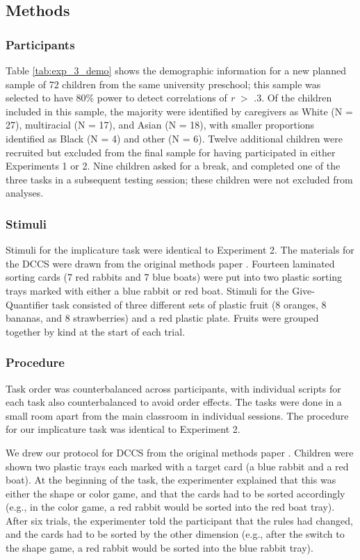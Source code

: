 \documentclass[man]{apa2}
\begin{document}
\subsection{Methods}

\subsubsection{Participants}

Table \ref{tab:exp_3_demo} shows the demographic information for a new planned sample of 72 children from the same university preschool; this sample was selected to have 80\% power to detect correlations of \emph{r} $>$ .3. Of the children included in this sample, the majority were identified by caregivers as White (N = 27), multiracial (N = 17), and Asian (N = 18), with smaller proportions identified as Black (N = 4) and other (N = 6). Twelve additional children were recruited but excluded from the final sample for having participated in either Experiments 1 or 2. Nine children asked for a break, and completed one of the three tasks in a subsequent testing session; these children were not excluded from analyses.

\subsubsection{Stimuli} Stimuli for the implicature task were identical to Experiment 2. The materials for the DCCS were drawn from the original methods paper \cite{zelazo2006}. Fourteen laminated sorting cards (7 red rabbits and 7 blue boats) were put into two plastic sorting trays marked with either a blue rabbit or red boat. Stimuli for the Give-Quantifier task \cite{barner2009} consisted of three different sets of plastic fruit (8 oranges, 8 bananas, and 8 strawberries) and a red plastic plate. Fruits were grouped together by kind at the start of each trial.

\subsubsection{Procedure}
Task order was counterbalanced across participants, with individual scripts for each task also counterbalanced to avoid order effects. The tasks were done in a small room apart from the main classroom in individual sessions. The procedure for our implicature task was identical to Experiment 2. 

We drew our protocol for DCCS from the original methods paper \cite{zelazo2006}. Children were shown two plastic trays each marked with a target card (a blue rabbit and a red boat). At the beginning of the task, the experimenter explained that this was either the shape or color game, and that the cards had to be sorted accordingly (e.g., in the color game, a red rabbit would be sorted into the red boat tray). After six trials, the experimenter told the participant that the rules had changed, and the cards had to be sorted by the other dimension (e.g., after the switch to the shape game, a red rabbit would be sorted into the blue rabbit tray).
\end{document}
